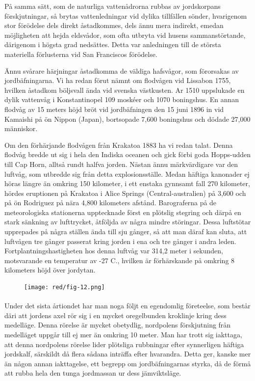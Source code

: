 \documentclass[a4paper, 12pt, oneside, swedish]{article}
\begin{document}
På samma sätt, som de naturliga vattenådrorna rubbas av jordskorpans förskjutningar, så brytas vattenledningar vid dylika tillfällen sönder, hvarigenom stor förödelse dels direkt åstadkommes, dels ännu mera indirekt, emedan möjligheten att hejda eldsvådor, som ofta utbryta vid husens sammanstörtande, därigenom i högsta grad nedsättes. Detta var anledningen till de största materiella förlusterna vid San Franciscos förödelse.

Ännu svårare härjningar åstadkomma de väldiga hafsvågor, som förorsakas av jordbäfningarna. Vi ha redan förut nämnt om flodvågen vid Lissabon 1755, hvilken åstadkom böljsvall ända vid svenska västkusten. Ar 1510 uppslukade en dylik vattenvåg i Konstantinopel 109 moskéer och 1070 boningshus. En annan flodvåg av 15 meters höjd bröt vid jordbäfningen den 15 juni 1896 in vid Kamaishi på ön Nippon (Japan), bortsopade 7,600 boningshus och dödade 27,000 människor.

Om den förhärjande flodvågen från Krakatoa 1883 ha vi redan talat. Denna flodvåg bredde ut sig i hela den Indiska oceanen och gick förbi goda Hopps-udden till Cap Horn, alltså rundt halfva jorden. Nästan ännu märkvärdigare var den luftvåg, som utbredde sig från detta explosionsställe. Medan häftiga kanonader ej höras längre än omkring 150 kilometer, i ett enstaka gynnsamt fall 270 kilometer, hördes eruptionen på Krakatoa i Alice Springs (Central-australien) på 3,600 och på ön Rodriguez på nära 4,800 kilometers afstånd. Barograferna på de meteorologiska stationerna upptecknade först en plötslig stegring och därpå en stark sänkning av lufttrycket, åtföljda av några mindre störingar. Dessa luftstötar upprepades på några ställen ända till sju gånger, så att man däraf kan sluta, att luftvågen tre gånger passerat kring jorden i ena och tre gånger i andra leden. Fortplantningshastigheten hos denna luftvåg var 314,2 meter i sekunden, motsvarande en temperatur av -27 C., hvilken är förhärskande på omkring 8 kilometers höjd över jordytan.

\begin{figure}[H]
\centering
\texttt{[image: red/fig-12.png]}
\caption{}
\end{figure}
\paragraph{}
Under det sista årtiondet har man noga följt en egendomlig företeelse, som består däri att jordens axel rör sig i en mycket oregelbunden kroklinje kring dess medelläge. Denna rörelse är mycket obetydlig, nordpolens förskjutning från medelläget uppgår till ej mer än omkring 10 meter. Man har trott sig iakttaga, att denna nordpolens rörelse lider plötsliga rubbningar efter synnerligen häftiga jordskalf, särskildt då flera sådana inträffa efter hvarandra. Detta ger, kanske mer än någon annan iakttagelse, ett begrepp om jordbäfningarnas styrka, då de förmå att rubba hela den tunga jordmassan ur dess jämviktsläge.
\end{document}
